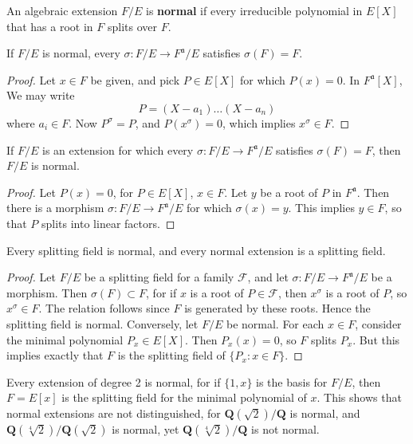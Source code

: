 An algebraic extension $F/E$ is {\bf normal} if every irreducible polynomial in $E[X]$ that has a root in $F$ splits over $F$.

\begin{lemma}
    If $F/E$ is normal, every $\sigma:F/E \to F^{\mathfrak{a}}/E$ satisfies $\sigma(F) = F$.
\end{lemma}
\begin{proof}
    Let $x \in F$ be given, and pick $P \in E[X]$ for which $P(x) = 0$. In $F^{\mathfrak{a}}[X]$, We may write
    \[ P = (X - a_1) \dots (X - a_n) \]
    where $a_i \in F$. Now $P^\sigma = P$, and $P(x^\sigma) = 0$, which implies $x^\sigma \in F$.
\end{proof}

\begin{theorem}
    If $F/E$ is an extension for which every $\sigma:F/E \to F^{\mathfrak{a}}/E$ satisfies $\sigma(F) = F$, then $F/E$ is normal.
\end{theorem}
\begin{proof}
    Let $P(x) = 0$, for $P \in E[X]$, $x \in F$. Let $y$ be a root of $P$ in $F^{\mathfrak{a}}$. Then there is a morphism $\sigma: F/E \to F^{\mathfrak{a}}/E$ for which $\sigma(x) = y$. This implies $y \in F$, so that $P$ splits into linear factors.
\end{proof}

\begin{corollary}
    Every splitting field is normal, and every normal extension is a splitting field.
\end{corollary}
\begin{proof}
    Let $F/E$ be a splitting field for a family $\mathcal{F}$, and let $\sigma: F/E \to F^{\mathfrak{a}}/E$ be a morphism. Then $\sigma(F) \subset F$, for if $x$ is a root of $P \in \mathcal{F}$, then $x^\sigma$ is a root of $P$, so $x^\sigma \in F$. The relation follows since $F$ is generated by these roots. Hence the splitting field is normal. Conversely, let $F/E$ be normal. For each $x \in F$, consider the minimal polynomial $P_x \in E[X]$. Then $P_x(x) = 0$, so $F$ splits $P_x$. But this implies exactly that $F$ is the splitting field of $\{ P_x : x \in F \}$.
\end{proof}

\begin{example}
    Every extension of degree 2 is normal, for if $\{ 1, x \}$ is the basis for $F/E$, then $F = E[x]$ is the splitting field for the minimal polynomial of $x$. This shows that normal extensions are not distinguished, for $\mathbf{Q}(\sqrt{2})/\mathbf{Q}$ is normal, and $\mathbf{Q}(\sqrt[4]{2})/\mathbf{Q}(\sqrt{2})$ is normal, yet $\mathbf{Q}(\sqrt[4]{2})/\mathbf{Q}$ is not normal.
\end{example}

